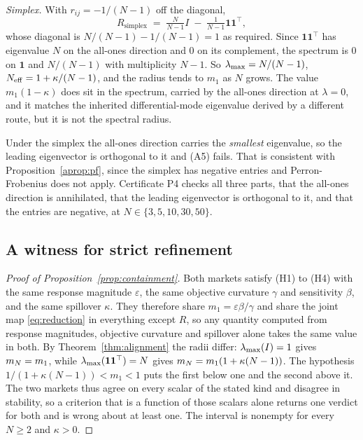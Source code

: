 \emph{Simplex.} With $r_{ij} = -1/(N-1)$ off the diagonal,
\[
  R_{\text{simplex}} \;=\; \tfrac{N}{N-1}I \;-\; \tfrac{1}{N-1}\mathbf{1}\mathbf{1}^{\top},
\]
whose diagonal is $N/(N-1) - 1/(N-1) = 1$ as required. Since $\mathbf{1}\mathbf{1}^{\top}$ has eigenvalue $N$ on the all-ones direction and $0$ on its complement, the spectrum is $0$ on $\mathbf{1}$ and $N/(N-1)$ with multiplicity $N-1$. So $\lambda_{\max} = N/(N-1)$, $N_{\mathrm{eff}} = 1 + \kappa/(N-1)$, and the radius tends to $m_1$ as $N$ grows. The value $m_1(1-\kappa)$ does sit in the spectrum, carried by the all-ones direction at $\lambda=0$, and it matches the inherited differential-mode eigenvalue derived by a different route, but it is not the spectral radius.

Under the simplex the all-ones direction carries the \emph{smallest} eigenvalue, so the leading eigenvector is orthogonal to it and (A5) fails. That is consistent with Proposition~\ref{aprop:pf}, since the simplex has negative entries and Perron-Frobenius does not apply. Certificate P4 checks all three parts, that the all-ones direction is annihilated, that the leading eigenvector is orthogonal to it, and that the entries are negative, at $N \in \{3,5,10,30,50\}$.

\subsection{A witness for strict refinement}

\begin{proof}[Proof of Proposition~\ref{prop:containment}]
Both markets satisfy (H1) to (H4) with the same response magnitude $\varepsilon$, the same objective curvature $\gamma$ and sensitivity $\beta$, and the same spillover $\kappa$. They therefore share $m_1 = \varepsilon\beta/\gamma$ and share the joint map \eqref{eq:reduction} in everything except $R$, so any quantity computed from response magnitudes, objective curvature and spillover alone takes the same value in both. By Theorem~\ref{thm:alignment} the radii differ: $\lambda_{\max}(I) = 1$ gives $m_N = m_1$, while $\lambda_{\max}(\mathbf{1}\mathbf{1}^{\top}) = N$ gives $m_N = m_1(1+\kappa(N-1))$. The hypothesis $1/(1+\kappa(N-1)) < m_1 < 1$ puts the first below one and the second above it. The two markets thus agree on every scalar of the stated kind and disagree in stability, so a criterion that is a function of those scalars alone returns one verdict for both and is wrong about at least one. The interval is nonempty for every $N \geq 2$ and $\kappa > 0$.
\end{proof}

